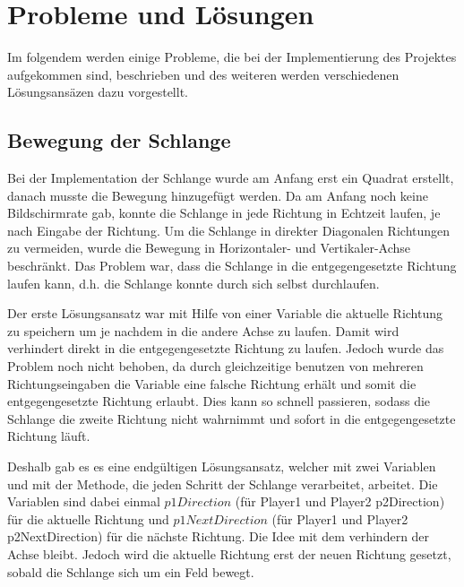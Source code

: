 
\chapter{Probleme und L{\"o}sungen}
\label{Probleme_und_Loesungen}
%
Im folgendem werden einige Probleme, die bei der Implementierung des Projektes aufgekommen sind, beschrieben und des weiteren werden verschiedenen L{\"o}sungsans{\"a}zen dazu vorgestellt.

\section{Bewegung der Schlange}
\label{Bewegung der Schlange}
%
Bei der Implementation der Schlange wurde am Anfang erst ein Quadrat erstellt, danach musste die Bewegung hinzugef{\"u}gt werden. Da am Anfang noch keine Bildschirmrate gab, konnte die Schlange in jede Richtung in Echtzeit laufen, je nach Eingabe der Richtung. Um die Schlange in direkter Diagonalen Richtungen zu vermeiden, wurde die Bewegung in Horizontaler- und Vertikaler-Achse beschr{\"a}nkt. Das Problem war, dass die Schlange in die entgegengesetzte Richtung laufen kann, d.h. die Schlange konnte durch sich selbst durchlaufen.

Der erste L{\"o}sungsansatz war mit Hilfe von einer Variable die aktuelle Richtung zu speichern um je nachdem in die andere Achse zu laufen. Damit wird verhindert direkt in die entgegengesetzte Richtung zu laufen. Jedoch wurde das Problem noch nicht behoben, da durch gleichzeitige benutzen von mehreren Richtungseingaben die Variable eine falsche Richtung erh{\"a}lt und somit die entgegengesetzte Richtung erlaubt. Dies kann so schnell passieren, sodass die Schlange die zweite Richtung nicht wahrnimmt und sofort in die entgegengesetzte Richtung l{\"a}uft.

Deshalb gab es es eine endg{\"u}ltigen L{\"o}sungsansatz, welcher mit zwei Variablen und mit der Methode, die jeden Schritt der Schlange verarbeitet, arbeitet. Die Variablen sind dabei einmal $p1Direction$ (f{\"u}r Player1 und Player2 p2Direction) f{\"u}r die aktuelle Richtung und $p1NextDirection$ (f{\"u}r Player1 und Player2 p2NextDirection) f{\"u}r die n{\"a}chste Richtung. Die Idee mit dem verhindern der Achse bleibt. Jedoch wird die aktuelle Richtung erst der neuen Richtung gesetzt, sobald die Schlange sich um ein Feld bewegt. 
%
